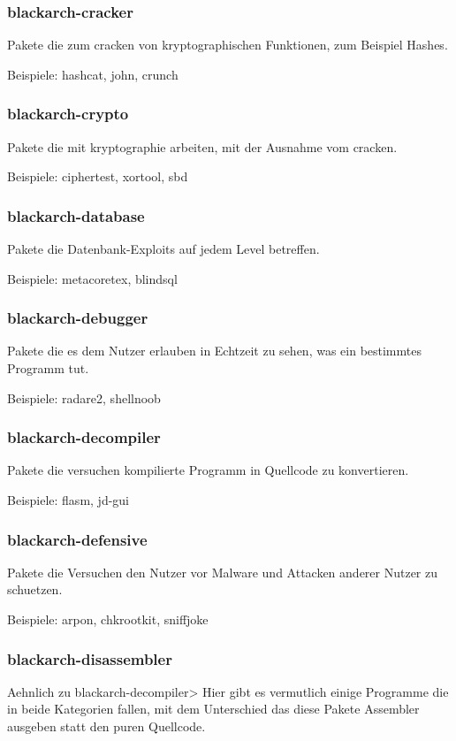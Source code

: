 \documentclass[a4paper, oneside, 11pt]{book}
\begin{document}
\subsubsection{blackarch-cracker}
Pakete die zum cracken von kryptographischen Funktionen, zum Beispiel Hashes.

Beispiele: hashcat, john, crunch

\subsubsection{blackarch-crypto}
Pakete die mit kryptographie arbeiten, mit der Ausnahme vom cracken.

Beispiele: ciphertest, xortool, sbd

\subsubsection{blackarch-database}
Pakete die Datenbank-Exploits auf jedem Level betreffen.

Beispiele: metacoretex, blindsql

\subsubsection{blackarch-debugger}
Pakete die es dem Nutzer erlauben in Echtzeit zu sehen, was ein bestimmtes Programm tut.

Beispiele: radare2, shellnoob

\subsubsection{blackarch-decompiler}
Pakete die versuchen kompilierte Programm in Quellcode zu konvertieren.

Beispiele: flasm, jd-gui

\subsubsection{blackarch-defensive}
Pakete die Versuchen den Nutzer vor Malware und Attacken anderer Nutzer zu schuetzen.

Beispiele: arpon, chkrootkit, sniffjoke

\subsubsection{blackarch-disassembler}
Aehnlich zu blackarch-decompiler> Hier gibt es vermutlich einige Programme die
in beide Kategorien fallen, mit dem Unterschied das diese Pakete Assembler ausgeben
statt den puren Quellcode.
\end{document}
